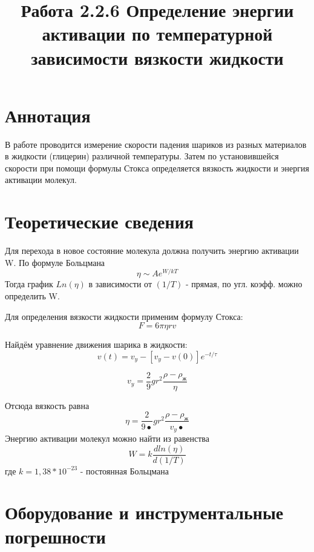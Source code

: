 \documentclass[a4paper]{article}
\title{Работа 2.2.6 Определение энергии активации по температурной зависимости вязкости жидкости}
\begin{document}
\maketitle
\section{Аннотация}
В работе проводится измерение скорости падения шариков из разных материалов в жидкости (глицерин) различной температуры. Затем по установившейся скорости при помощи формулы Стокса определяется вязкость жидкости и энергия активации молекул.
\section{Теоретические сведения}
Для перехода в новое состояние молекула должна получить энергию активации W. По формуле Больцмана 
\begin{equation}
\eta \sim Ae^{W/k T}
\end{equation}
Тогда график $Ln(\eta)$ в зависимости от $(1/T)$ - прямая, по угл. коэфф. можно определить W.

Для определения вязкости жидкости применим формулу Стокса:
\begin{equation}
F=6 \pi \eta r v
\label{stox}
\end{equation}

Найдём уравнение движения шарика в жидкости:
\begin{equation}
v (t) = v_{y} - [ v_{y} - v (0)] e^{-t/\tau}
\end{equation}

\begin{equation}
v_y = \frac{2}{9} g r^2 \frac{\rho - \rho_{ж}}{\eta}
\end{equation}

Отсюда вязкость равна
\begin{equation}
\eta = \frac{2}{9•} g r^2 \frac{\rho - \rho_{ж}}{v_y•}
\label{eq}
\end{equation}
Энергию активации молекул можно найти из равенства
\begin{equation}
W = k \frac{d ln(\eta)}{d(1/T)}
\label{nrg}
\end{equation}
где $k=1,38*10^{-23}$ - постоянная Больцмана
\section{Оборудование и инструментальные погрешности}
\end{document}
